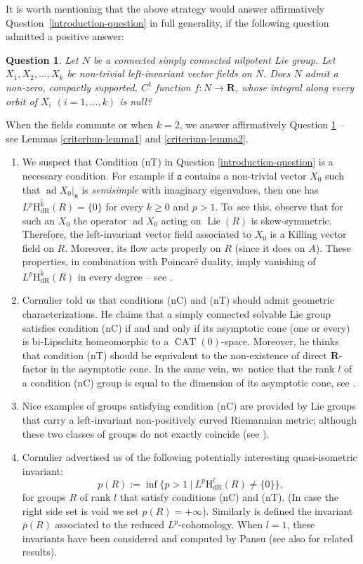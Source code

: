 \documentclass[JEP,XML,SOM,Unicode,published]{cedram}
\newcommand{\dR}{\mathrm{dR}}
\newcommand{\rH}{\mathrm{H}}
\newcommand{\fra}{\mathfrak{a}}
\newcommand{\frn}{\mathfrak{n}}
\newcommand{\RR}{\mathbf{R}}
\theoremstyle{plain}
\newtheorem{question}[equation]{Question}
\theoremstyle{remark}
\theoremstyle{definition}
\DeclareMathOperator{\ad}{ad}
\DeclareMathOperator{\CAT}{CAT}
\DeclareMathOperator{\Lie}{Lie}
\newcommand{\restr}{\big|}
\begin{document}
It is worth mentioning that the above strategy would answer affirmatively Question~\ref{introduction-question}
in full generality, if the following question admitted a positive answer:
\begin{question}\label{introduction-question2} Let $N$ be a connected simply connected nilpotent Lie group.
Let $X_1, X_2, \dots , X_k$ be non-trivial left-invariant vector fields on $N$. Does $N$ admit a non-zero,
compactly supported, $C^1$ function
$f: N \to\RR$, whose integral along every orbit of $X_i$ $(i = 1, \dots , k)$ is null?
\end{question}
When the fields commute or when $k =2$, we answer affirmatively Question \ref{introduction-question2} --
see Lemmas \ref{criterium-lemma1} and \ref{criterium-lemma2}.

\begin{enumerate}
\item
We suspect that Condition (nT) in Question \ref{introduction-question} is a necessary condition.
For example if $\fra$ contains a non-trivial vector $X_0$ such that $\ad X_0 \restr_\frn$ is \emph{semisimple}
with imaginary eigenvalues, then one has $L^p\overline{\rH_\dR^k}(R) = \{0\}$
for every $k \geqslant 0$ and $p > 1$.
To~see this, observe that for such an $X_0$ the operator $\ad X_0$ acting on $\Lie(R)$ is skew-symmetric.
Therefore, the left-invariant
vector field associated to $X_0$ is a Killing vector field on $R$.
Moreover, its flow acts properly on $R$ (since it does on $A$).
These properties, in combination with Poincaré duality, imply vanishing of
$L^p\overline{\rH_\dR^k}(R)$ in every degree --
see \cite[Proof of Prop.\,15]{P1}.

\item
Cornulier told us that conditions (nC) and (nT) should admit geometric characterizations. He claims that a simply connected solvable Lie group
satisfies condition (nC) if and and only if its asymptotic cone (one or every) is bi-Lipschitz homeomorphic to a $\CAT(0)$-space. Moreover, he thinks that condition
(nT) should be equivalent to the non-existence of direct $\RR$-factor in the asymptotic cone.
In the same vein, we~notice that the rank $l$ of a condition (nC) group is equal to the dimension of its asymptotic cone, see \cite[Th.\,1.1]{C}.

\item
Nice examples of groups satisfying condition (nC) are provided by Lie groups that carry a left-invariant non-positively curved
Riemannian metric; although these two classes of groups do not exactly coincide (see \cite[Th.\,7.6]{AW}).

\item
Cornulier advertised us of the following potentially interesting quasi-isometric invariant:
\[p(R):= \inf \bigl\{p > 1 ~\vert~ L^p \rH_\dR^l (R) \neq \{0\} \bigr\},\]
for groups $R$ of rank $l$ that satisfy conditions (nC) and (nT).
(In case the right side set is void we set
$p(R) = +\infty$). Similarly is defined the invariant $\overline p (R)$ associated to the reduced $L^p$\nobreakdash-cohomology.
When $l =1$, these invariants have been considered and computed by Pansu \cite{P2} (see also \cite{CT} for related results).
\end{enumerate}
\end{document}
